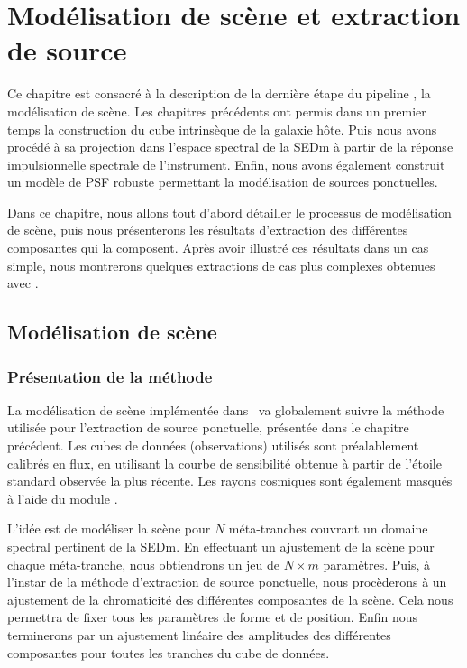 \documentclass[../main/main.tex]{subfiles}
\begin{document}
\setcounter{chapter}{7}
\chapter{Modélisation de scène et extraction de source}\label{ch:res}
\minitoc
\vspace{2cm}
Ce chapitre est consacré à la description de la dernière étape du pipeline \hypergal, la
modélisation de scène. Les chapitres précédents ont permis dans un
premier temps la
construction du cube intrinsèque de la galaxie hôte. Puis nous avons
procédé à sa projection dans
l'espace spectral de la SEDm à partir de la réponse impulsionnelle
spectrale de l'instrument. Enfin, nous avons également construit un modèle
de PSF robuste permettant la modélisation de sources ponctuelles.

Dans ce chapitre, nous allons tout d'abord détailler le processus de
modélisation de scène, puis nous présenterons les résultats d'extraction des
différentes composantes qui la composent. Après avoir illustré ces
résultats dans un cas simple, nous montrerons quelques extractions de cas
plus complexes obtenues avec \hypergal.
\newpage

\section{Modélisation de scène}

\subsection{Présentation de la méthode}

La modélisation de scène implémentée dans \hypergal\ va globalement
suivre la méthode utilisée pour l'extraction de source ponctuelle,
présentée dans le chapitre précédent. Les cubes de données (observations) utilisés sont
préalablement calibrés en flux, en utilisant la courbe de sensibilité
obtenue à partir de l'étoile standard observée la plus
récente. Les rayons cosmiques sont également masqués à l'aide du module
 \citep{Kimcontsep}.

L'idée est de modéliser la scène pour $N$ méta-tranches couvrant un
domaine spectral pertinent de la SEDm. En effectuant un ajustement de la
scène pour chaque méta-tranche, nous obtiendrons un jeu de
$N\times m$ paramètres. Puis, à l'instar de la méthode d'extraction de source
ponctuelle, nous procèderons à un ajustement de la chromaticité des
différentes composantes de la scène. Cela nous permettra de fixer tous
les paramètres de forme et de position. Enfin nous terminerons par un ajustement linéaire
des amplitudes des différentes composantes pour toutes les tranches du cube de données.
\end{document}
